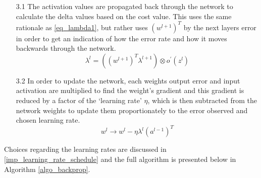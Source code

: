 \documentclass[a4paper,11pt,oneside]{article}
\theoremstyle{plain}
\theoremstyle{definition}
\begin{document}
\begin{itemize}
		\begin{itemize}
		\item [3.1] The activation values are propagated back through the network to calculate the delta values based on the cost value. This uses the same rationale as \eqref{eq_lambda1}, but rather uses $(w^{l+1})^T$ by the next layers error in order to get an indication of how the error rate and how it moves backwards through the network.
						\begin{equation}\label{eq_lambda4}
						\lambda^l = ((w^{l+1})^T\lambda^{l+1})  \otimes o^{\prime}(z^l)
						\end{equation}
		\item [3.2] In order to update the network, each weights output error and input activation are multiplied to find the weight’s gradient and this gradient is reduced by a factor of the ‘learning rate’ $\eta$, which is then subtracted from the network weights to update them proportionately to the error observed and chosen learning rate.
						\begin{equation}\label{eq_bp_weightupdate}
						w^l \rightarrow w^l - {\eta}\lambda^{l} (a^{l - 1})^T
						\end{equation}
	\end{itemize}
		
\end{itemize}

Choices regarding the learning rates are discussed in \ref{imp_learning_rate_schedule} and the full algorithm is presented below in Algorithm \ref{algo_backprop}.\newline
\end{document}
